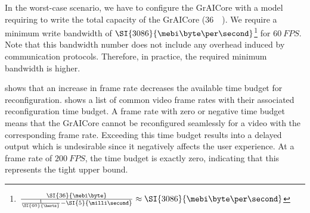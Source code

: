 In the worst-case scenario, we have to configure the GrAICore with a model requiring to write the total capacity of the GrAICore (\SI{36}{\mebi\byte}).
We require a minimum write bandwidth of $\SI{3086}{\mebi\byte\per\second}$\footnote{$\frac{\SI{36}{\mebi\byte}}{\frac{1}{\SI{60}{\hertz}} - \SI{5}{\milli\second}} \approx \SI{3086}{\mebi\byte\per\second}$} for $\SI{60}{FPS}$.
Note that this bandwidth number does not include any overhead induced by communication protocols. Therefore, in practice, the required minimum bandwidth is higher. 

 shows that an increase in frame rate decreases the available time budget for reconfiguration.
 shows a list of common video frame rates with their associated reconfiguration time budget.
A frame rate with zero or negative time budget means that the GrAICore cannot be reconfigured seamlessly for a video with the corresponding frame rate.
Exceeding this time budget results into a delayed output which is undesirable since it negatively affects the user experience.
At a frame rate of $\SI{200}{FPS}$, the time budget is exactly zero, indicating that this represents the tight upper bound.

%     



